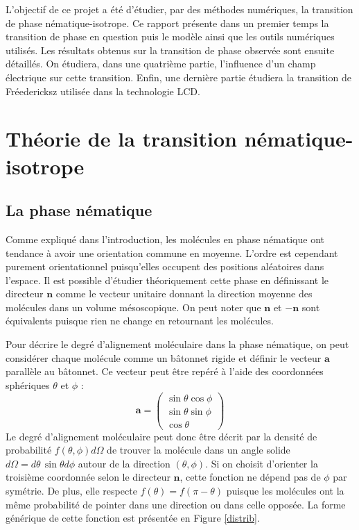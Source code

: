 \documentclass[11pt,a4paper]{article}
\numberwithin{equation}{section}
\begin{document}
L'objectif de ce projet a été d'étudier, par des méthodes numériques, la transition de phase nématique-isotrope. Ce rapport présente dans un premier temps la transition de phase en question puis le modèle ainsi que les outils numériques utilisés. Les résultats obtenus sur la transition de phase observée sont ensuite détaillés. On étudiera, dans une quatrième partie, l'influence d'un champ électrique sur cette transition. Enfin, une dernière partie étudiera la transition de Fréedericksz utilisée dans la technologie LCD.

\newpage
\section{Théorie de la transition nématique-isotrope}
\subsection{La phase nématique}
Comme expliqué dans l'introduction, les molécules en phase nématique ont tendance à avoir une orientation commune en moyenne. L'ordre est cependant purement orientationnel puisqu'elles occupent des positions aléatoires dans l'espace. Il est possible d’étudier théoriquement cette phase en définissant le directeur $\bm{n}$ comme le vecteur unitaire donnant la direction moyenne des molécules dans un volume mésoscopique. On peut noter que $\bm{n}$ et $-\bm{n}$ sont équivalents puisque rien ne change en retournant les molécules.
\medskip

Pour décrire le degré d'alignement moléculaire dans la phase nématique, on peut considérer chaque molécule comme un bâtonnet rigide et définir le vecteur $\bm{a}$ parallèle au bâtonnet. Ce vecteur peut être repéré à l'aide des coordonnées sphériques $\theta$ et $\phi$ :
\begin{equation}
\bm{a} =
\begin{pmatrix}
 \sin \theta \cos \phi \\
 \sin \theta \sin \phi \\
 \cos \theta 
 \end{pmatrix} 
\end{equation}
Le degré d'alignement moléculaire peut donc être décrit par la densité de probabilité $f(\theta,\phi)d\Omega$ de trouver la molécule dans un angle solide $d\Omega = d\theta\, \sin \theta d\phi$ autour de la direction $(\theta,\phi)$. Si on choisit d'orienter la troisième coordonnée selon le directeur $\bm{n}$, cette fonction ne dépend pas de $\phi$ par symétrie. De plus, elle respecte $f(\theta) = f(\pi - \theta)$ puisque les molécules ont la même probabilité de pointer dans une direction ou dans celle opposée. La forme générique de cette fonction est présentée en Figure \ref{distrib}.
\end{document}
